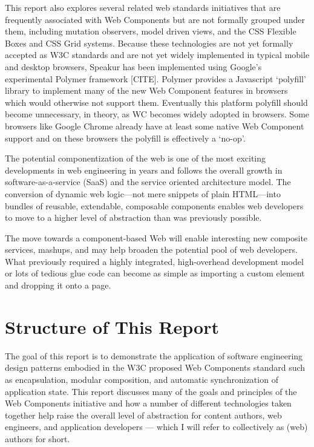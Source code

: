 This report also explores several related web standards initiatives that are frequently associated with Web Components 
but are not formally grouped under them, including mutation observers,
model driven views, 
and the CSS Flexible Boxes
and CSS Grid
systems. 
Because these technologies are not yet formally accepted as W3C standards and are not yet widely implemented in typical mobile and desktop browsers, 
Speakur has been implemented using Google's experimental Polymer framework [CITE].
Polymer provides a Javascript `polyfill'
library to implement many of the new Web Component features in browsers which would otherwise not support them. 
Eventually this platform polyfill should become unnecessary, in theory, as WC becomes widely adopted in browsers.
Some browsers like Google Chrome already have at least some native Web Component support and on these browsers the polyfill is effectively a `no-op'.

The potential componentization of the web is one of the most exciting developments in web engineering in years and follows the overall growth in software-as-a-service (SaaS) 
and the service oriented architecture
model. 
The conversion of dynamic web logic---not mere snippets of plain HTML---into bundles of reusable, extendable, composable components enables web developers to move to a higher level of abstraction than was previously possible.

The move towards a component-based Web will enable interesting new composite services, mashups, and may help broaden the potential pool of web developers. 
What previously required a highly integrated, high-overhead development model or lots of tedious glue code can become as simple as importing a custom element and dropping it onto a page.


\section{Structure of This Report}
%

The goal of this report is to demonstrate the application of software engineering design patterns embodied in the  W3C proposed Web Components standard such as encapsulation, modular composition, and automatic synchronization of application state. 
This report discusses many of the goals and principles of the Web Components initiative and how a number of different technologies taken together help raise the overall level of abstraction for content authors, web engineers, and application developers --- which I will refer to collectively as (web) authors for short.

